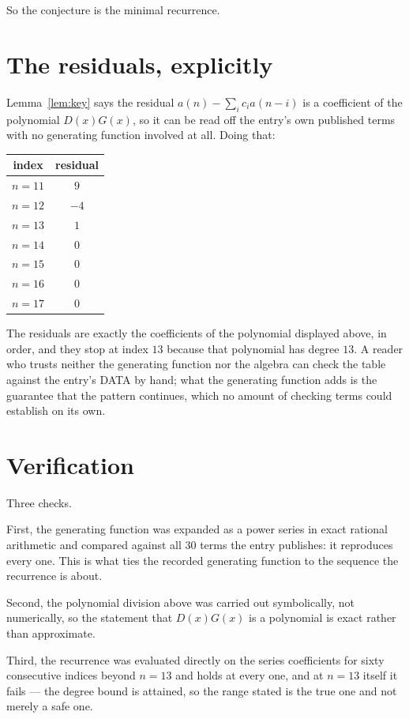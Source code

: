 \documentclass[11pt,a4paper]{article}
\theoremstyle{plain}
\theoremstyle{definition}
\begin{document}
So the conjecture is the minimal recurrence.

\section{The residuals, explicitly}

Lemma~\ref{lem:key} says the residual $a(n)-\sum_ic_ia(n-i)$ is a coefficient of the
polynomial $D(x)G(x)$, so it can be read off the entry's own published terms with no
generating function involved at all. Doing that:
\begin{center}
\begin{tabular}{cc}
index & residual \\ \hline
$n=11$ & $9$ \\
$n=12$ & $-4$ \\
$n=13$ & $1$ \\
$n=14$ & $0$ \\
$n=15$ & $0$ \\
$n=16$ & $0$ \\
$n=17$ & $0$
\end{tabular}
\end{center}
The residuals are exactly the coefficients of the polynomial displayed above, in order, and
they stop at index $13$ because that polynomial has degree $13$. A reader who trusts
neither the generating function nor the algebra can check the table against the entry's DATA
by hand; what the generating function adds is the guarantee that the pattern continues, which
no amount of checking terms could establish on its own.

\section{Verification}

Three checks.

First, the generating function was expanded as a power series in exact rational arithmetic and
compared against all $30$ terms the entry publishes: it reproduces every one. This is
what ties the recorded generating function to the sequence the recurrence is about.

Second, the polynomial division above was carried out symbolically, not numerically, so the
statement that $D(x)G(x)$ is a polynomial is exact rather than approximate.

Third, the recurrence was evaluated directly on the series coefficients for sixty consecutive
indices beyond $n=13$ and holds at every one, and at $n=13$ itself it fails --- the
degree bound is attained, so the range stated is the true one and not merely a safe one.
\end{document}
